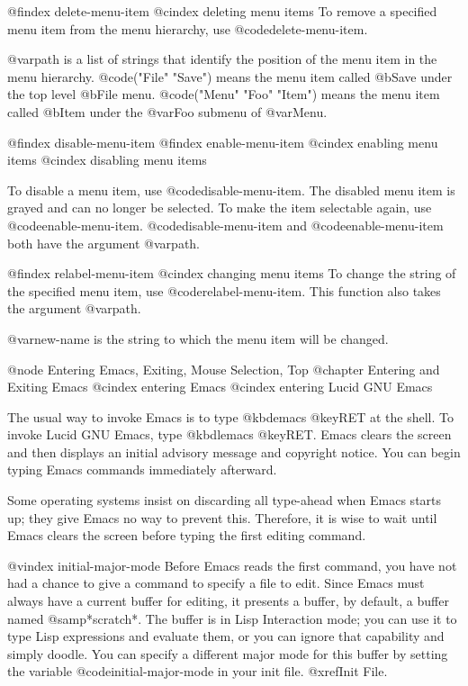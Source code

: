 {{@findex delete-menu-item
@cindex deleting menu items
To remove a specified menu item from the menu hierarchy, use
@code{delete-menu-item}.

@var{path} is a list of strings that identify the position of the menu
item in the menu hierarchy.  @code{("File" "Save")} means the menu item
called @b{Save} under the top level @b{File} menu.  @code{("Menu" "Foo"
"Item")} means the menu item called @b{Item} under the @var{Foo} submenu
of @var{Menu}.

@findex disable-menu-item
@findex enable-menu-item
@cindex enabling menu items
@cindex disabling menu items

To disable a menu item, use @code{disable-menu-item}.  The disabled
menu item is grayed and can no longer be selected.  To make the
item selectable again, use @code{enable-menu-item}.
@code{disable-menu-item} and @code{enable-menu-item} both have the
argument @var{path}.

@findex relabel-menu-item
@cindex changing menu items
To change the string of the specified menu item, use
@code{relabel-menu-item}. This function also takes the argument @var{path}.

@var{new-name} is the string to which the menu item will be changed.

@node Entering Emacs, Exiting, Mouse Selection, Top
@chapter Entering and Exiting Emacs
@cindex entering Emacs
@cindex entering Lucid GNU Emacs

  The usual way to invoke Emacs is to type @kbd{emacs @key{RET}} at
the shell.  To invoke Lucid GNU Emacs, type @kbd{lemacs @key{RET}}.
Emacs clears the screen and then displays an initial advisory message and
copyright notice.  You can begin typing Emacs commands immediately
afterward.

  Some operating systems insist on discarding all type-ahead when Emacs
starts up; they give Emacs no way to prevent this.  Therefore, it is
wise to wait until Emacs clears the screen before typing the first
editing command.

@vindex initial-major-mode
  Before Emacs reads the first command, you have not had a chance to
give a command to specify a file to edit.  Since Emacs must always have a
current buffer for editing, it presents a buffer, by default, a buffer named
@samp{*scratch*}.  The buffer is in Lisp Interaction
mode; you can use it to type Lisp expressions and evaluate them, or you
can ignore that capability and simply doodle.  You can specify a
different major mode for this buffer by setting the variable
@code{initial-major-mode} in your init file.  @xref{Init File}.

}}
